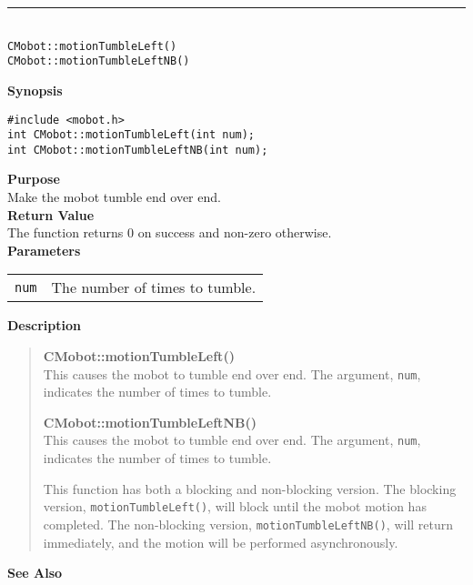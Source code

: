 \noindent
\vspace{5pt}
\rule{4.5in}{0.015in}\\
\noindent
{\LARGE \texttt{CMobot::motionTumbleLeft()}}\\
{\LARGE \texttt{CMobot::motionTumbleLeftNB()}}\\
{}

\noindent
{\bf Synopsis}
\vspace{-8pt}
\begin{verbatim}
#include <mobot.h>
int CMobot::motionTumbleLeft(int num);
int CMobot::motionTumbleLeftNB(int num);
\end{verbatim}

\noindent
{\bf Purpose}\\
Make the mobot tumble end over end.\\

\noindent
{\bf Return Value}\\
The function returns 0 on success and non-zero otherwise.\\

\noindent
{\bf Parameters}\\
\vspace{-0.1in}
\begin{description}
\item               
\begin{tabular}{p{10 mm}p{145 mm}}
\texttt{num} & The number of times to tumble. \\
\end{tabular}
\end{description}

\noindent
{\bf Description}\\
\vspace{-12pt}
\begin{quote}
{\bf CMobot::motionTumbleLeft()}\\
This causes the mobot to tumble end over end. The argument, \texttt{num},
indicates the number of times to tumble.

{\bf CMobot::motionTumbleLeftNB()}\\
This causes the mobot to tumble end over end. The argument, \texttt{num},
indicates the number of times to tumble.

This function has both a blocking and non-blocking version.
The blocking version, \texttt{motionTumbleLeft()}, will block until the
mobot motion has completed. The non-blocking version, \texttt{motionTumbleLeftNB()},
will return immediately, and the motion will be performed asynchronously.\\
\end{quote}

\noindent
{\bf See Also}\\

